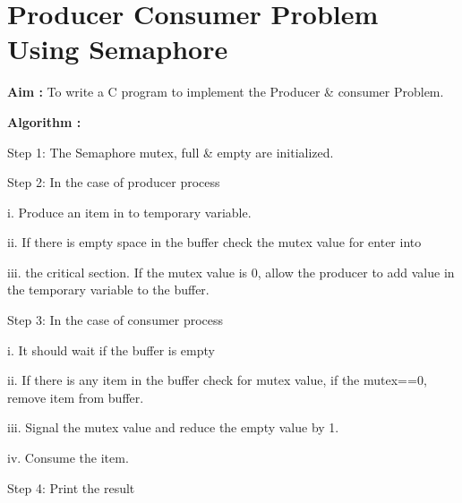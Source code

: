 \documentclass[journal,onecolumn]{IEEEtran}
\begin{document}
\section{Producer Consumer Problem Using Semaphore}
\textbf{Aim : } To write a C program to implement the Producer \& consumer Problem.


\textbf{Algorithm : }
\begin{list}{}{}
  \item Step 1: The Semaphore mutex, full \& empty are initialized.
  \item Step 2: In the case of producer process
        \begin{list}{}{}
          \item i. Produce an item in to temporary variable.
          \item ii.
                If there is empty space in the buffer check the mutex value for enter into
          \item iii.
                the critical section.
                If the mutex value is 0, allow the producer to add value in the temporary
                variable to the buffer.
        \end{list}

  \item Step 3: In the case of consumer process
        \begin{list}{}{}
          \item i. It should wait if the buffer is empty
          \item ii. If there is any item in the buffer check for mutex value, if the mutex==0, remove item from buffer.
          \item iii. Signal the mutex value and reduce the empty value by 1.
          \item iv. Consume the item.
        \end{list}
  \item Step 4: Print the result
\end{list}
\end{document}
